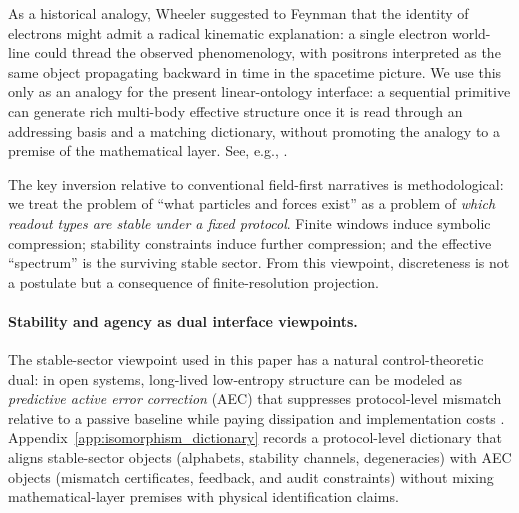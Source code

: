 \begin{remark}\label{rem:wheeler_one_electron}
As a historical analogy, Wheeler suggested to Feynman that the identity of electrons might admit a radical kinematic explanation: a single electron world-line could thread the observed phenomenology, with positrons interpreted as the same object propagating backward in time in the spacetime picture.
We use this only as an analogy for the present linear-ontology interface: a sequential primitive can generate rich multi-body effective structure once it is read through an addressing basis and a matching dictionary, without promoting the analogy to a premise of the mathematical layer.
See, e.g., \cite{Feynman1949TheoryPositrons,Feynman1965NobelLecture}.
\end{remark}

The key inversion relative to conventional field-first narratives is methodological:
we treat the problem of ``what particles and forces exist'' as a problem of \emph{which readout types are stable under a fixed protocol}.
Finite windows induce symbolic compression; stability constraints induce further compression; and the effective ``spectrum'' is the surviving stable sector.
From this viewpoint, discreteness is not a postulate but a consequence of finite-resolution projection.

\paragraph{Stability and agency as dual interface viewpoints.}
The stable-sector viewpoint used in this paper has a natural control-theoretic dual: in open systems, long-lived low-entropy structure can be modeled as \emph{predictive active error correction} (AEC) that suppresses protocol-level mismatch relative to a passive baseline while paying dissipation and implementation costs \cite{AstromMurray2008FeedbackSystems,Landauer1961}.
Appendix~\ref{app:isomorphism_dictionary} records a protocol-level dictionary that aligns stable-sector objects (alphabets, stability channels, degeneracies) with AEC objects (mismatch certificates, feedback, and audit constraints) without mixing mathematical-layer premises with physical identification claims.


